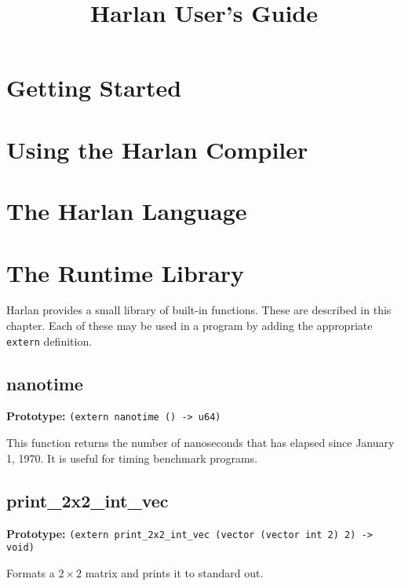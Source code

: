 \documentclass{book}
\begin{document}

\title{Harlan User's Guide}

\maketitle

\tableofcontents

\chapter{Getting Started}

\chapter{Using the Harlan Compiler}

\chapter{The Harlan Language}

\chapter{The Runtime Library}

Harlan provides a small library of built-in functions. These are
described in this chapter. Each of these may be used in a program by
adding the appropriate \lstinline{extern} definition.

\section{nanotime}

\textbf{Prototype:} \lstinline{(extern nanotime () -> u64)}

This function returns the number of nanoseconds that has elapsed since
January 1, 1970. It is useful for timing benchmark programs.

\section{print\_2x2\_int\_vec}

\textbf{Prototype:} \lstinline{(extern print_2x2_int_vec (vector (vector int 2) 2) -> void)}

Formats a $2 \times 2$ matrix and prints it to standard out.
\end{document}

